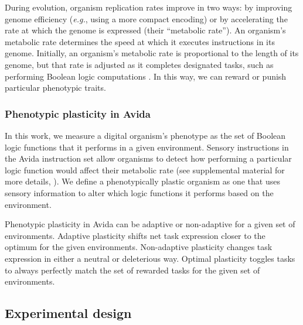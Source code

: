 During evolution, organism replication rates improve in two ways: by improving genome efficiency (\textit{e.g.}, using a more compact encoding) or by accelerating the rate at which the genome is expressed (their ``metabolic rate'').
An organism's metabolic rate determines the speed at which it executes instructions in its genome.
Initially, an organism's metabolic rate is proportional to the length of its genome, but that rate is adjusted as it completes designated tasks, such as performing Boolean logic computations \citep{ofria_avida:_2009}.
In this way, we can reward or punish particular phenotypic traits. 

\subsubsection{Phenotypic plasticity in Avida}

In this work, we measure a digital organism's phenotype as the set of Boolean logic functions that it performs in a given environment.
Sensory instructions in the Avida instruction set allow organisms to detect how performing a particular logic function would affect their metabolic rate (see supplemental material for more details, \citealt{consequences_of_plasticity_supplemental_material_2021}). 
We define a phenotypically plastic organism as one that uses sensory information to alter which logic functions it performs based on the environment.

Phenotypic plasticity in Avida can be adaptive or non-adaptive for a given set of environments.
Adaptive plasticity shifts net task expression closer to the optimum for the given environments.
Non-adaptive plasticity changes task expression in either a neutral or deleterious way. 
Optimal plasticity toggles tasks to always perfectly match the set of rewarded tasks for the given set of environments.

\subsection{Experimental design}
\label{chapter:consequences-of-plasticity:sec:methods:experiment}




